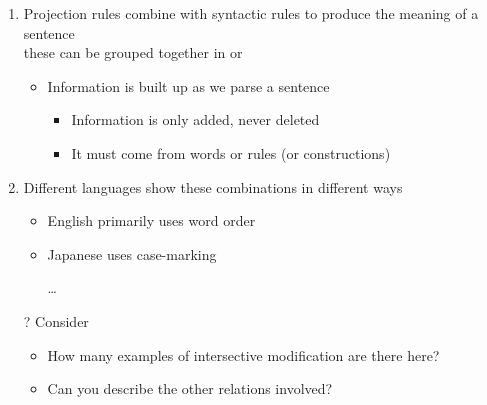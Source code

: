 \documentclass[a4paper,landscape,headrule,footrule,xetex]{foils}
\begin{document}

\begin{enumerate}
\item Projection rules combine with syntactic rules to produce the
  meaning of a sentence
  \\ these can be grouped together in  or 
  \begin{itemize}
  \item Information is built up as we parse a sentence
    \begin{itemize}
    \item Information is only added, never deleted
    \item It must come from words or rules (or constructions)
    \end{itemize}
  \end{itemize}
\item Different languages show these combinations in different ways
  \begin{itemize}
  \item English primarily uses word order
  \item Japanese uses case-marking
  \item [\ldots{}]
  \end{itemize}
\item[?] Consider 
  \begin{itemize}
  \item How many examples of intersective modification are there here?\task
  \item Can you describe the other relations involved?\task
  \end{itemize}
  
\end{enumerate}


\end{document}

